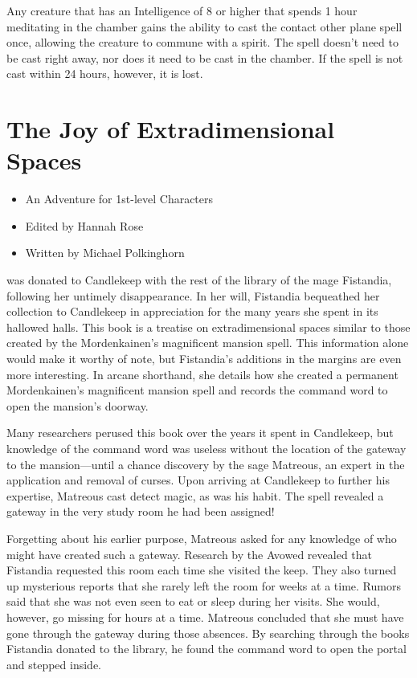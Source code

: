 \documentclass[10pt,a4paper,twoside,bg=print,twocolumn,openany,nodeprecatedcode]{dndbook}
\begin{document}
Any creature that has an Intelligence of 8 or higher that spends 1 hour meditating in the chamber gains the ability to cast the contact other plane spell once, allowing the creature to commune with a spirit. The spell doesn't need to be cast right away, nor does it need to be cast in the chamber. If the spell is not cast within 24 hours, however, it is lost.

\chapter{The Joy of Extradimensional Spaces}

\begin{itemize}
\item An Adventure for 1st-level Characters
\item Edited by Hannah Rose
\item Written by Michael Polkinghorn
\end{itemize}

 was donated to Candlekeep with the rest of the library of the mage Fistandia, following her untimely disappearance. In her will, Fistandia bequeathed her collection to Candlekeep in appreciation for the many years she spent in its hallowed halls. This book is a treatise on extradimensional spaces similar to those created by the Mordenkainen's magnificent mansion spell. This information alone would make it worthy of note, but Fistandia's additions in the margins are even more interesting. In arcane shorthand, she details how she created a permanent Mordenkainen's magnificent mansion spell and records the command word to open the mansion's doorway.


Many researchers perused this book over the years it spent in Candlekeep, but knowledge of the command word was useless without the location of the gateway to the mansion—until a chance discovery by the sage Matreous, an expert in the application and removal of curses. Upon arriving at Candlekeep to further his expertise, Matreous cast detect magic, as was his habit. The spell revealed a gateway in the very study room he had been assigned!

Forgetting about his earlier purpose, Matreous asked for any knowledge of who might have created such a gateway. Research by the Avowed revealed that Fistandia requested this room each time she visited the keep. They also turned up mysterious reports that she rarely left the room for weeks at a time. Rumors said that she was not even seen to eat or sleep during her visits. She would, however, go missing for hours at a time. Matreous concluded that she must have gone through the gateway during those absences. By searching through the books Fistandia donated to the library, he found the command word to open the portal and stepped inside.
\end{document}

